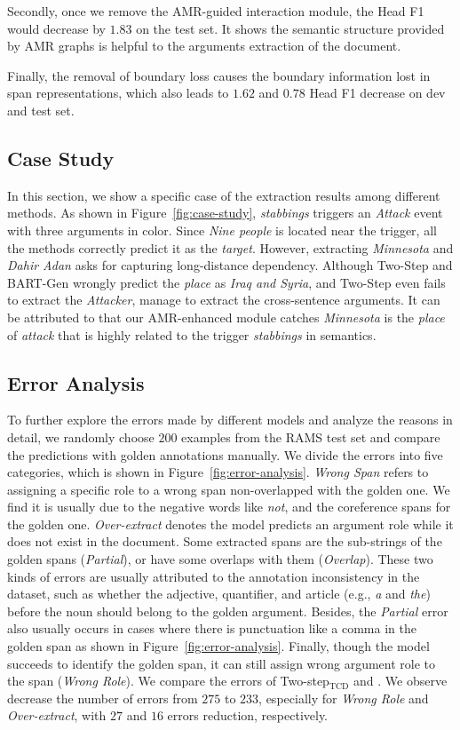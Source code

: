 Secondly, once we remove the AMR-guided interaction module, the Head F1 would decrease by $1.83$ on the test set.
It shows the semantic structure provided by AMR graphs is helpful to the arguments extraction of the document.

Finally, the removal of boundary loss causes the boundary information lost in span representations, which also leads to $1.62$ and $0.78$ Head F1 decrease on dev and test set.

\subsection{Case Study}

In this section, we show a specific case of the extraction results among different methods.
As shown in Figure~\ref{fig:case-study}, \emph{stabbings} triggers an \emph{Attack} event with three arguments in color.
Since \emph{Nine people} is located near the trigger, all the methods correctly predict it as the \emph{target}.
However, extracting \emph{Minnesota} and \emph{Dahir Adan} asks for capturing long-distance dependency.
Although Two-Step and BART-Gen wrongly predict the \emph{place} as \emph{Iraq and Syria}, and Two-Step even fails to extract the \emph{Attacker}, \modelname manage to extract the cross-sentence arguments.
It can be attributed to that our AMR-enhanced module catches \emph{Minnesota} is the \emph{place} of \emph{attack} that is highly related to the trigger \emph{stabbings} in semantics.

\subsection{Error Analysis}

To further explore the errors made by different models and analyze the reasons in detail, we randomly choose $200$ examples from the RAMS test set and compare the predictions with golden annotations manually.
We divide the errors into five categories, which is shown in Figure~\ref{fig:error-analysis}.
\emph{Wrong Span} refers to assigning a specific role to a wrong span non-overlapped with the golden one.
We find it is usually due to the negative words like \emph{not}, and the coreference spans for the golden one.
\emph{Over-extract} denotes the model predicts an argument role while it does not exist in the document.
Some extracted spans are the sub-strings of the golden spans (\emph{Partial}), or have some overlaps with them (\emph{Overlap}).
These two kinds of errors are usually attributed to the annotation inconsistency in the dataset, such as whether the adjective, quantifier, and article (e.g., \emph{a} and \emph{the}) before the noun should belong to the golden argument.
Besides, the \emph{Partial} error also usually occurs in cases where there is punctuation like a comma in the golden span as shown in Figure~\ref{fig:error-analysis}.
Finally, though the model succeeds to identify the golden span, it can still assign wrong argument role to the span (\emph{Wrong Role}).
We compare the errors of Two-step$_{\mathrm{TCD}}$ and \modelnamebase.
We observe \modelname decrease the number of errors from $275$ to $233$, especially for \emph{Wrong Role} and \emph{Over-extract}, with $27$ and $16$ errors reduction, respectively.